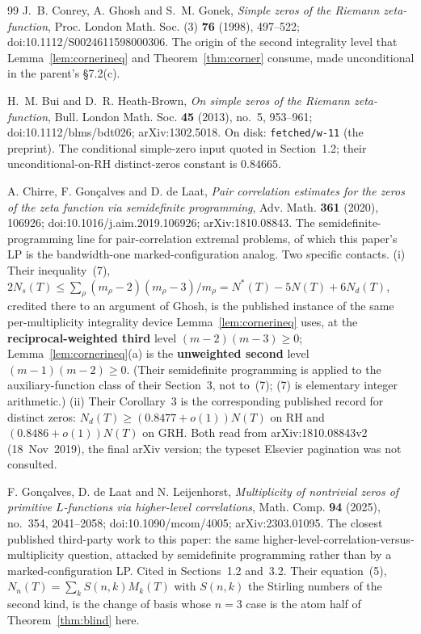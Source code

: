 \documentclass[11pt]{article}
\theoremstyle{plain}
\theoremstyle{definition}
\theoremstyle{remark}
\newcommand{\Nd}{N_{d}}
\begin{document}
\begin{thebibliography}{99}
 J.~B. Conrey, A. Ghosh and S.~M. Gonek, \emph{Simple
zeros of the Riemann zeta-function}, Proc. London Math. Soc. (3) \textbf{76}
(1998), 497--522; doi:10.1112/S0024611598000306. The origin of the second
integrality level that
Lemma~\ref{lem:cornerineq} and Theorem~\ref{thm:corner} consume, made
unconditional in the parent's \S7.2(c).

 H.~M. Bui and D.~R. Heath-Brown, \emph{On simple zeros of
the Riemann zeta-function}, Bull. London Math. Soc. \textbf{45} (2013),
no.~5, 953--961; doi:10.1112/blms/bdt026; arXiv:1302.5018. On disk:
\texttt{fetched/w-11} (the preprint). The conditional simple-zero input
quoted in Section~1.2; their unconditional-on-RH distinct-zeros constant is
$0.84665$.

 A. Chirre, F. Gon\c{c}alves and D. de Laat, \emph{Pair
correlation estimates for the zeros of the zeta function via semidefinite
programming}, Adv. Math. \textbf{361} (2020), 106926;
doi:10.1016/j.aim.2019.106926; arXiv:1810.08843. The
semidefinite-programming line for pair-correlation extremal problems, of which
this paper's LP is the bandwidth-one marked-configuration analog. Two specific
contacts. (i) Their inequality~(7),
$2 N_s(T) \le \sum_\rho (m_\rho - 2)(m_\rho - 3)/m_\rho
 = N^{*}(T) - 5N(T) + 6\Nd(T)$, credited there to an argument of Ghosh, is the
published instance of the same per-multiplicity integrality device
Lemma~\ref{lem:cornerineq} uses, at the \textbf{reciprocal-weighted third} level
$(m-2)(m-3) \ge 0$; Lemma~\ref{lem:cornerineq}(a) is the \textbf{unweighted
second} level $(m-1)(m-2) \ge 0$. (Their semidefinite programming is applied to the
auxiliary-function class of their Section~3, not to~(7); (7) is elementary integer
arithmetic.) (ii) Their Corollary~3 is the corresponding published record for
distinct zeros: $\Nd(T) \ge (0.8477 + o(1))N(T)$ on RH and
$(0.8486 + o(1))N(T)$ on GRH. Both read from arXiv:1810.08843v2 (18~Nov~2019), the
final arXiv version; the typeset Elsevier pagination was not consulted.

 F. Gon\c{c}alves, D. de Laat and N. Leijenhorst,
\emph{Multiplicity of nontrivial zeros of primitive $L$-functions via higher-level
correlations}, Math. Comp. \textbf{94} (2025), no.~354, 2041--2058;
doi:10.1090/mcom/4005; arXiv:2303.01095. The closest published third-party work to
this paper: the same higher-level-correlation-versus-multiplicity question, attacked
by semidefinite programming rather than by a marked-configuration LP. Cited in
Sections~1.2 and~3.2. Their equation~(5),
$N_n(T) = \sum_k S(n,k) M_k(T)$ with $S(n,k)$ the Stirling numbers of the second
kind, is the change of basis whose $n = 3$ case is the atom half of
Theorem~\ref{thm:blind} here.


\end{thebibliography}
\end{document}
